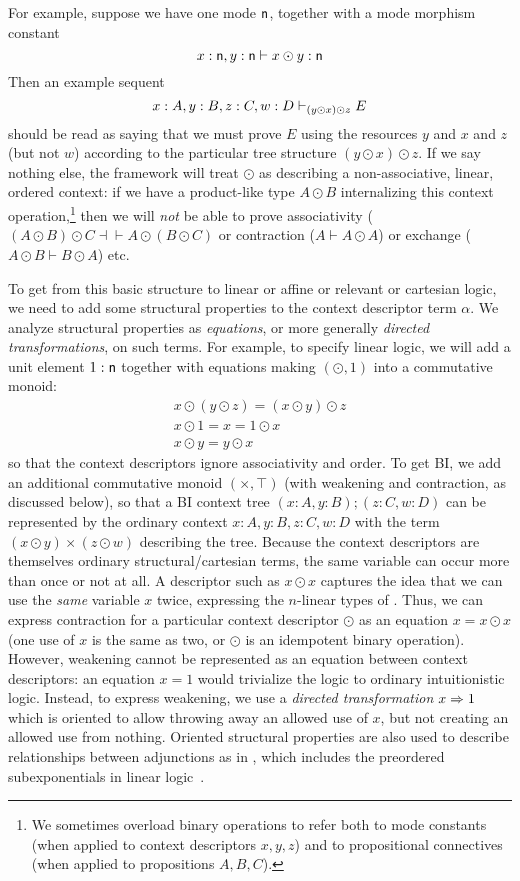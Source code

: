 For example, suppose we have one mode $\mathsf{n}$, together with a mode
morphism constant
\[
x : \mathsf{n}, y:\mathsf{n} \vdash x \odot y : \mathsf{n}
\]
Then an example sequent
\[
x:A, y:B, z:C, w:D \vdash_{(y \odot x) \odot z} E
\]
should be read as saying that we must prove $E$ using the resources $y$
and $x$ and $z$ (but not $w$) according to the particular tree structure
${(y \odot x) \odot z}$.  If we say nothing else, the framework will
treat $\odot$ as describing a non-associative, linear, ordered context:
if we have a product-like type $A \odot B$ internalizing this context
operation,\footnote{We sometimes overload binary operations to refer
  both to mode constants (when applied to context descriptors $x,y,z$)
  and to propositional connectives (when applied to propositions
  $A,B,C$).} then we will \emph{not} be able to prove associativity ($(A
\odot B) \odot C \dashv\vdash A \odot (B \odot C)$ or contraction ($A
\vdash A \odot A$) or exchange ($A \odot B \vdash B \odot A$) etc.

To get from this basic structure to linear or affine or relevant or
cartesian logic, we need to add some structural properties to the
context descriptor term $\alpha$.  We analyze structural properties as
\emph{equations}, or more generally \emph{directed transformations}, on
such terms.  For example, to specify linear logic, we will add a unit
element $1 : \mathsf{n}$ together with equations making $(\odot,1)$ into a
commutative monoid:
\[
\begin{array}{c}
x \odot (y \odot z) = (x \odot y) \odot z\\
x \odot 1 = x = 1 \odot x\\
x \odot y = y \odot x
\end{array}
\]
so that the context descriptors ignore associativity and order.  To get
BI, we add an additional commutative monoid $(\times,\top)$ (with
weakening and contraction, as discussed below), so that a BI context
tree $(x:A,y:B);(z:C,w:D)$ can be represented by the ordinary context
$x:A,y:B,z:C,w:D$ with the term $(x \odot y) \times (z \odot w)$
describing the tree.  Because the context descriptors are themselves
ordinary structural/cartesian terms, the same variable can occur more
than once or not at all.  A descriptor such as $x \odot x$ captures the
idea that we can use the \emph{same} variable $x$ twice, expressing the
$n$-linear types of \citet{reed}.  Thus, we can express contraction for
a particular context descriptor $\odot$ as an equation $x = x \odot x$
(one use of $x$ is the same as two, or $\odot$ is an idempotent binary
operation).  However, weakening cannot be represented as an equation
between context descriptors: an equation $x = 1$ would trivialize the
logic to ordinary intuitionistic logic.  Instead, to express weakening,
we use a \emph{directed transformation} $x \Rightarrow 1$ which is oriented to
allow throwing away an allowed use of $x$, but not creating an allowed
use from nothing.  Oriented structural properties are also used to
describe relationships between adjunctions as in \citep{ls16adjoint},
which includes the preordered subexponentials in linear
logic~\citep{damos,nigman}.

